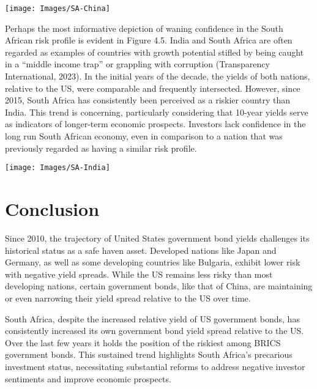 \documentclass[11pt,preprint, authoryear]{elsarticle}
\let\origfigure\figure
\let\endorigfigure\endfigure
\renewenvironment{figure}[1][2] {
    \expandafter\origfigure\expandafter[H]
} {
    \endorigfigure
}
\numberwithin{equation}{section}
\numberwithin{figure}{section}
\numberwithin{table}{section}
\begin{document}
\begin{figure}

{\centering \texttt{[image: Images/SA-China]} 

}

\caption{SA vs China Yield Spread \label{Figure4.4}}\label{fig:unnamed-chunk-11}
\end{figure}

Perhaps the most informative depiction of waning confidence in the South
African risk profile is evident in Figure 4.5. India and South Africa
are often regarded as examples of countries with growth potential
stifled by being caught in a ``middle income trap'' or grappling with
corruption (Transparency International, 2023). In the initial years of
the decade, the yields of both nations, relative to the US, were
comparable and frequently intersected. However, since 2015, South Africa
has consistently been perceived as a riskier country than India. This
trend is concerning, particularly considering that 10-year yields serve
as indicators of longer-term economic prospects. Investors lack
confidence in the long run South African economy, even in comparison to
a nation that was previously regarded as having a similar risk profile.

\begin{figure}

{\centering \texttt{[image: Images/SA-India]} 

}

\caption{SA vs India Yield Spread \label{Figure4.5}}\label{fig:unnamed-chunk-12}
\end{figure}

\hypertarget{conclusion}{%
\section{Conclusion}\label{conclusion}}

Since 2010, the trajectory of United States government bond yields
challenges its historical status as a safe haven asset. Developed
nations like Japan and Germany, as well as some developing countries
like Bulgaria, exhibit lower risk with negative yield spreads. While the
US remains less risky than most developing nations, certain government
bonds, like that of China, are maintaining or even narrowing their yield
spread relative to the US over time.

South Africa, despite the increased relative yield of US government
bonds, has consistently increased its own government bond yield spread
relative to the US. Over the last few years it holds the position of the
riskiest among BRICS government bonds. This sustained trend highlights
South Africa's precarious investment status, necessitating substantial
reforms to address negative investor sentiments and improve economic
prospects.
\end{document}

